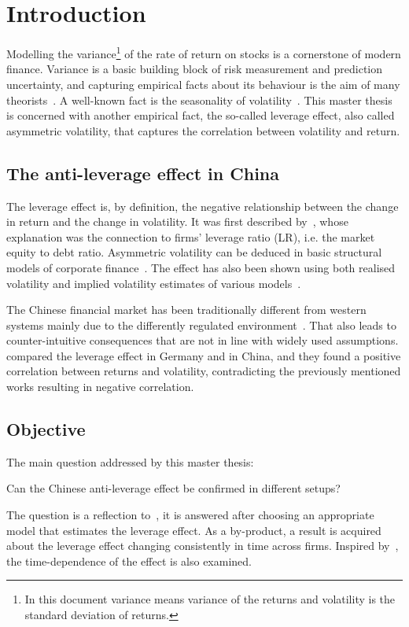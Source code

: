 \section{Introduction}

Modelling the variance\footnote{In this document variance means variance of the returns and volatility is the standard deviation of returns.} of the rate of return on stocks is a cornerstone of modern finance.
Variance is a basic building block of risk measurement and prediction uncertainty, and capturing empirical facts about its behaviour is the aim of many theorists~\citep{Christie1982}.
A well-known fact is the seasonality of volatility~\citep{schwert1989why}.
This master thesis is concerned with another empirical fact, the so-called leverage effect, also called asymmetric volatility, that captures the correlation between volatility and return.

\subsection{The anti-leverage effect in China}

The leverage effect is, by definition, the negative relationship between the change in return and the change in volatility.
It was first described by~\citet{black1976studies}, whose explanation was the connection to firms' leverage ratio (LR), i.e. the market equity to debt ratio.
Asymmetric volatility can be deduced in basic structural models of corporate finance~\citep{Christie1982}.
The effect has also been shown using both realised volatility and implied volatility estimates of various models~\citep{Bouchaud2001,Harvey1996,Christie1982,french1987expected}.

The Chinese financial market has been traditionally different from western systems mainly due to the differently regulated environment~\citep{GORDON2003}.
That also leads to counter-intuitive consequences that are not in line with widely used assumptions.
\citet{Shen2009} compared the leverage effect in Germany and in China, and they found a positive correlation between returns and volatility, contradicting the previously mentioned works resulting in negative correlation.


\subsection{Objective}

The main question addressed by this master thesis:
\begin{center}
	Can the Chinese anti-leverage effect be confirmed in different setups?
\end{center}
The question is a reflection to~\citet{Shen2009}, it is answered after choosing an appropriate model that estimates the leverage effect.
As a by-product, a result is acquired about the leverage effect changing consistently in time across firms.
Inspired by~\citet{christensen2015impact}, the time-dependence of the effect is also examined.
